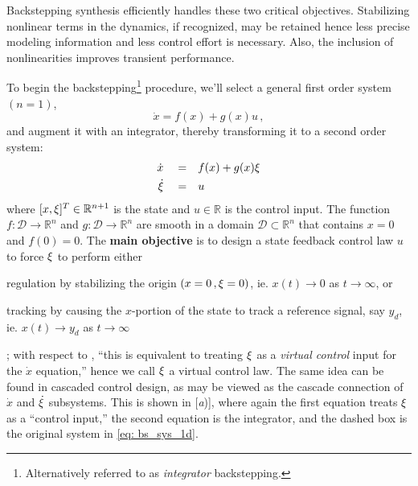 \documentclass[12pt]{ucthesis}
\begin{document}
Backstepping synthesis efficiently handles these two critical objectives. Stabilizing nonlinear terms in the dynamics, if recognized, may be retained hence less precise modeling information and less control effort is necessary. Also, the inclusion of nonlinearities improves transient performance.

To begin the backstepping\footnote{Alternatively referred to as \textit{integrator} backstepping.} procedure, we'll select a general first order system $(n=1)$, 
	\begin{equation}
		\dot{x}= f(x)+g(x)u \,,	
		\label{eq: bs_sys_1d}
	\end{equation}
and augment it with an integrator, thereby transforming it to a second order system:
	\begin{subequations} \label{eq: bs_sys_2d}
		\begin{align} 
			\label{eq: bs_sys_2da} \dot{x} 	\quad =& \quad f(x)+g(x)\xi \\
			\label{eq: bs_sys_2db} \dot{\xi} \quad =& \quad u
		\end{align}
	\end{subequations}
where $[x,\xi]^T \in \mathbb{R}^{n+1}$ is the state and $u \in \mathbb{R}$ is the control input. The function $f:\mathcal{D} \to \mathbb{R}^n$ and $g:\mathcal{D} \to \mathbb{R}^n$ are smooth in a domain $\mathcal{D} \subset \mathbb{R}^n$ that contains $x=0$ and $f(0)=0$. The \textbf{main objective} is to design a state feedback control law $u$ to force $\xi$ to perform either \begin{inparaenum}[\itshape 1\upshape)] \item{regulation by stabilizing the origin $(x = 0 \,, \xi = 0)$, ie. $x(t) \to 0$ as $t \to \infty$, or} \item{tracking by causing the $x$-portion of the state to track a reference signal, say $y_d$, ie.  $x(t) \to y_d$ as $t \to \infty$} \end{inparaenum}; with respect to , ``this is equivalent to treating $\xi$ as a \textit{virtual control} input for the $\dot{x}$ equation,'' hence we call $\xi$ a virtual control law. The same idea can be found in cascaded control design, as  may be viewed as the cascade connection of $\dot{x}$ and $\dot{\xi}$ subsystems. This is shown in [\textit{a})], where again the first equation treats $\xi$ as a ``control input,'' the second equation is the integrator, and the dashed box is the original system in \autoref{eq: bs_sys_1d}.
\end{document}
